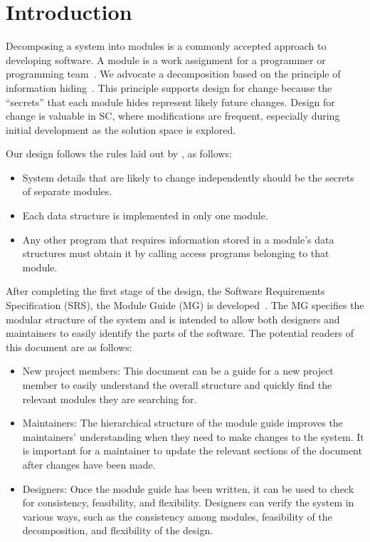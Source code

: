 \documentclass[12pt, titlepage]{article}
\begin{document}
\newpage

\tableofcontents

\listoftables

\listoffigures

\newpage


\section{Introduction}

Decomposing a system into modules is a commonly accepted approach to developing
software.  A module is a work assignment for a programmer or programming
team~\citep{ParnasEtAl1984}.  We advocate a decomposition
based on the principle of information hiding~\citep{Parnas1972a}.  This
principle supports design for change because the ``secrets'' that each module
hides represent likely future changes.  Design for change is valuable in SC,
where modifications are frequent, especially during initial development as the
solution space is explored.  

Our design follows the rules laid out by \citet{ParnasEtAl1984}, as follows:
\begin{itemize}
\item System details that are likely to change independently should be the
  secrets of separate modules.
\item Each data structure is implemented in only one module.
\item Any other program that requires information stored in a module's data
  structures must obtain it by calling access programs belonging to that module.
\end{itemize}

After completing the first stage of the design, the Software Requirements
Specification (SRS), the Module Guide (MG) is developed~\citep{ParnasEtAl1984}. The MG
specifies the modular structure of the system and is intended to allow both
designers and maintainers to easily identify the parts of the software.  The
potential readers of this document are as follows:

\begin{itemize}
\item New project members: This document can be a guide for a new project member
  to easily understand the overall structure and quickly find the
  relevant modules they are searching for.
\item Maintainers: The hierarchical structure of the module guide improves the
  maintainers' understanding when they need to make changes to the system. It is
  important for a maintainer to update the relevant sections of the document
  after changes have been made.
\item Designers: Once the module guide has been written, it can be used to
  check for consistency, feasibility, and flexibility. Designers can verify the
  system in various ways, such as the consistency among modules, feasibility of the
  decomposition, and flexibility of the design.
\end{itemize}
\end{document}
